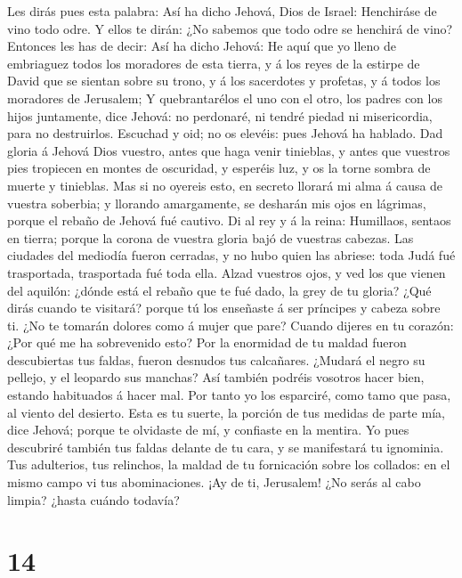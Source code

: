  Les dirás pues esta palabra: Así ha dicho Jehová, Dios de
Israel: Henchiráse de vino todo odre. Y ellos te dirán: ¿No sabemos que
todo odre se henchirá de vino?  Entonces les has de decir:
Así ha dicho Jehová: He aquí que yo lleno de embriaguez todos los
moradores de esta tierra, y á los reyes de la estirpe de David que se
sientan sobre su trono, y á los sacerdotes y profetas, y á todos los
moradores de Jerusalem;  Y quebrantarélos el uno con el
otro, los padres con los hijos juntamente, dice Jehová: no perdonaré, ni
tendré piedad ni misericordia, para no destruirlos. 
Escuchad y oid; no os elevéis: pues Jehová ha hablado.  Dad
gloria á Jehová Dios vuestro, antes que haga venir tinieblas, y antes
que vuestros pies tropiecen en montes de oscuridad, y esperéis luz, y os
la torne sombra de muerte y tinieblas.  Mas si no oyereis
esto, en secreto llorará mi alma á causa de vuestra soberbia; y llorando
amargamente, se desharán mis ojos en lágrimas, porque el rebaño de
Jehová fué cautivo.  Di al rey y á la reina: Humillaos,
sentaos en tierra; porque la corona de vuestra gloria bajó de vuestras
cabezas.  Las ciudades del mediodía fueron cerradas, y no
hubo quien las abriese: toda Judá fué trasportada, trasportada fué toda
ella.  Alzad vuestros ojos, y ved los que vienen del
aquilón: ¿dónde está el rebaño que te fué dado, la grey de tu gloria?
 ¿Qué dirás cuando te visitará? porque tú los enseñaste á
ser príncipes y cabeza sobre ti. ¿No te tomarán dolores como á mujer que
pare?  Cuando dijeres en tu corazón: ¿Por qué me ha
sobrevenido esto? Por la enormidad de tu maldad fueron descubiertas tus
faldas, fueron desnudos tus calcañares.  ¿Mudará el negro
su pellejo, y el leopardo sus manchas? Así también podréis vosotros
hacer bien, estando habituados á hacer mal.  Por tanto yo
los esparciré, como tamo que pasa, al viento del desierto. 
Esta es tu suerte, la porción de tus medidas de parte mía, dice Jehová;
porque te olvidaste de mí, y confiaste en la mentira.  Yo
pues descubriré también tus faldas delante de tu cara, y se manifestará
tu ignominia.  Tus adulterios, tus relinchos, la maldad de
tu fornicación sobre los collados: en el mismo campo vi tus
abominaciones. ¡Ay de ti, Jerusalem! ¿No serás al cabo limpia? ¿hasta
cuándo todavía?

\hypertarget{section-13}{%
\section{14}\label{section-13}}

